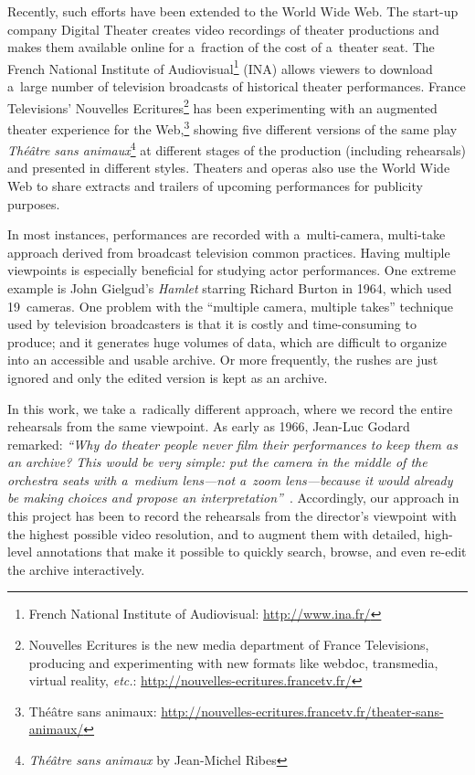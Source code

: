 \documentclass[conference]{IEEEtran}
\begin{document}
Recently, such efforts have been extended to the World Wide Web. The start-up company Digital Theater 
creates video recordings of  theater productions  and makes them available  online for a~fraction of the cost of a~theater seat. The French National Institute of Audiovisual\footnote{French National Institute of Audiovisual: \url{http://www.ina.fr/}} (INA) allows viewers to download a~large number of   television broadcasts of historical theater performances. France Televisions' Nouvelles Ecritures\footnote{Nouvelles Ecritures is the new media department of France Televisions, producing and experimenting with new formats like webdoc, transmedia, virtual reality, \emph{etc.}: \url{http://nouvelles-ecritures.francetv.fr/}}  has been experimenting with an augmented theater experience for the Web,\footnote{Théâtre sans animaux: \url{http://nouvelles-ecritures.francetv.fr/theater-sans-animaux/}} showing five different versions of the same play \emph{Théâtre sans animaux}\footnote{\emph{Théâtre sans animaux} by Jean-Michel Ribes} at different stages of the production (including rehearsals) and presented in different styles. Theaters and operas also use the World Wide Web to share extracts and trailers of upcoming performances for publicity purposes. 

In most instances, performances are recorded with a~multi-camera, multi-take approach derived from broadcast television common practices. Having multiple viewpoints is especially beneficial for studying actor performances.  One extreme example is John Gielgud's  \emph{Hamlet} starring Richard Burton in 1964,  which used 19~cameras.  One problem with the ``multiple camera, multiple takes'' technique used by television broadcasters  is that it is costly and time-consuming to produce; and it generates huge volumes of data, which are  difficult to organize into an accessible and usable archive. Or more frequently, the rushes  are just ignored and only the edited version is kept as an archive. 

In this work, we take a~radically different approach, where we record the entire rehearsals from the same viewpoint.  As early as 1966, Jean-Luc Godard remarked: {\em ``Why do theater people never film their performances to keep  them as an archive? This would be very simple: put the camera in the middle of the orchestra seats with a~medium lens---not a~zoom lens---because it would already be making choices and propose an interpretation''}~\cite{Godard66}. Accordingly, our approach in this project has been to record the rehearsals from the director's viewpoint  with the highest possible video resolution, and to augment them with detailed, high-level  annotations that make it possible to quickly  search, browse, and even re-edit the archive interactively. 
\end{document}
